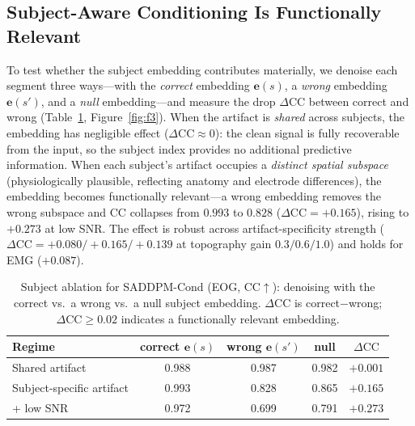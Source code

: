 \subsection{Subject-Aware Conditioning Is Functionally Relevant}
\label{sec:exp_subject_loadbearing}
To test whether the subject embedding contributes materially, we denoise each segment
three ways---with the \emph{correct} embedding $\mathbf{e}(s)$, a \emph{wrong}
embedding $\mathbf{e}(s')$, and a \emph{null} embedding---and measure the drop
$\Delta\mathrm{CC}$ between correct and wrong (Table~\ref{tab:p2_subject},
Figure~\ref{fig:f3}). When
the artifact is \emph{shared} across subjects, the embedding has negligible effect
($\Delta\mathrm{CC}\approx 0$): the clean signal is fully recoverable from the
input, so the subject index provides no additional predictive information. When
each subject's artifact occupies a \emph{distinct spatial subspace}
(physiologically plausible, reflecting anatomy and electrode differences), the
embedding becomes functionally relevant---a wrong embedding removes the wrong
subspace and CC collapses from
$0.993$ to $0.828$ ($\Delta\mathrm{CC}=+0.165$), rising to $+0.273$ at low SNR.
The effect is robust across artifact-specificity strength
($\Delta\mathrm{CC}=+0.080/+0.165/+0.139$ at topography gain $0.3/0.6/1.0$) and
holds for EMG ($+0.087$).

\begin{table}[t]
  \caption{Subject ablation for \mbox{SADDPM-Cond} (EOG, CC$\uparrow$): denoising with
  the correct vs.\ a wrong vs.\ a null subject embedding. $\Delta\mathrm{CC}$ is
  correct$-$wrong; $\Delta\mathrm{CC}\ge 0.02$ indicates a functionally relevant embedding.}
  \label{tab:p2_subject}
  \small
  \begin{tabular}{lcccc}
    \toprule
    Regime & correct $\mathbf{e}(s)$ & wrong $\mathbf{e}(s')$ & null & $\Delta\mathrm{CC}$ \\
    \midrule
    Shared artifact & 0.988 & 0.987 & 0.982 & $+0.001$ \\
    Subject-specific artifact & 0.993 & 0.828 & 0.865 & $\mathbf{+0.165}$ \\
    \quad + low SNR & 0.972 & 0.699 & 0.791 & $\mathbf{+0.273}$ \\
    \bottomrule
  \end{tabular}
\end{table}

